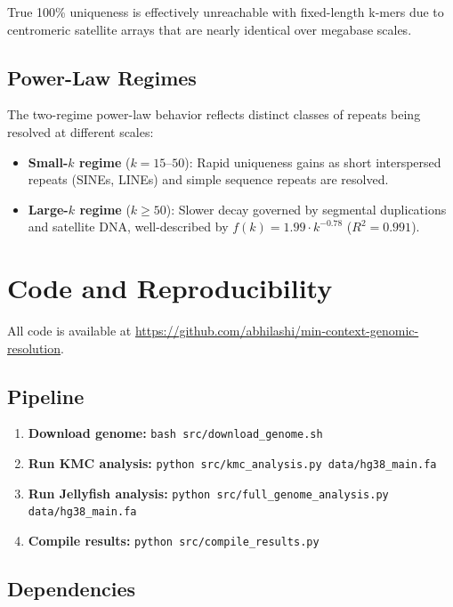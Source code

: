 \documentclass[11pt,a4paper]{article}
\begin{document}
True 100\% uniqueness is effectively unreachable with fixed-length k-mers due to centromeric satellite arrays that are nearly identical over megabase scales.

\subsection{Power-Law Regimes}

The two-regime power-law behavior reflects distinct classes of repeats being resolved at different scales:

\begin{itemize}
    \item \textbf{Small-$k$ regime} ($k = 15$--$50$): Rapid uniqueness gains as short interspersed repeats (SINEs, LINEs) and simple sequence repeats are resolved.
    \item \textbf{Large-$k$ regime} ($k \geq 50$): Slower decay governed by segmental duplications and satellite DNA, well-described by $f(k) = 1.99 \cdot k^{-0.78}$ ($R^2 = 0.991$).
\end{itemize}

\section{Code and Reproducibility}

All code is available at \url{https://github.com/abhilashi/min-context-genomic-resolution}.

\subsection{Pipeline}

\begin{enumerate}
    \item \textbf{Download genome:} \texttt{bash src/download\_genome.sh}
    \item \textbf{Run KMC analysis:} \texttt{python src/kmc\_analysis.py data/hg38\_main.fa}
    \item \textbf{Run Jellyfish analysis:} \texttt{python src/full\_genome\_analysis.py data/hg38\_main.fa}
    \item \textbf{Compile results:} \texttt{python src/compile\_results.py}
\end{enumerate}

\subsection{Dependencies}
\end{document}
